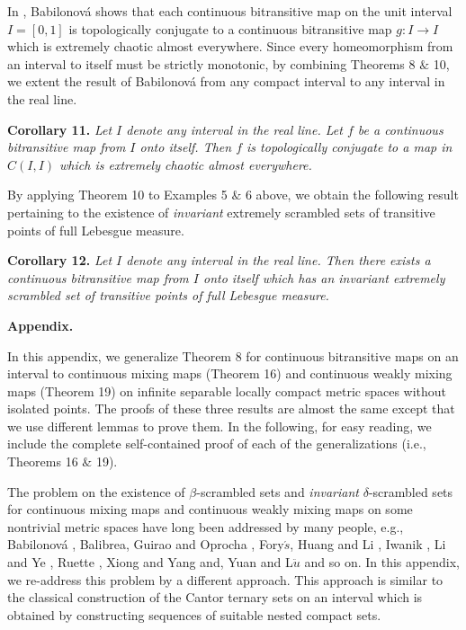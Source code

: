 \documentclass[12pt]{article}
\begin{document}
In {\bf\cite{bab}}, Babilonov\'a shows that each continuous bitransitive map on the unit interval $I = [0, 1]$ is topologically conjugate to a continuous bitransitive map $g: I \longrightarrow I$ which is extremely chaotic almost everywhere.  Since every homeomorphism from an interval to itself must be strictly monotonic, by combining Theorems 8 $\&$ 10, we extent the result of Babilonov\'a from any compact interval to any interval in the real line.

\noindent
{\bf Corollary 11.}
{\it Let $I$ denote any interval in the real line.  Let $f$ be a continuous bitransitive map from $I$ onto itself. Then $f$ is topologically conjugate to a map in $C(I, I)$ which is extremely chaotic almost everywhere.}

By applying Theorem 10 to Examples 5 $\&$ 6 above, we obtain the following result pertaining to the existence of {\it invariant} extremely scrambled sets of transitive points of full Lebesgue measure.

\noindent
{\bf Corollary 12.}
{\it Let $I$ denote any interval in the real line.  Then there exists a continuous bitransitive map from $I$ onto itself which has an invariant extremely scrambled set of transitive points of full Lebesgue measure.} 

\pagebreak

{\bf Appendix.}

In this appendix, we generalize Theorem 8 for continuous bitransitive maps on an interval to continuous mixing maps (Theorem 16) and continuous weakly mixing maps (Theorem 19) on infinite separable locally compact metric spaces without isolated points.  The proofs of these three results are almost the same except that we use different lemmas to prove them.  In the following, for easy reading, we include the complete self-contained proof of each of the generalizations (i.e., Theorems 16 $\&$ 19).  

The problem on the existence of $\beta$-scrambled sets and {\it invariant} $\delta$-scrambled sets for continuous mixing maps and continuous weakly mixing maps on some nontrivial metric spaces have long been addressed by many people, e.g., Babilonov\'a {\bf\cite{bab}}, Balibrea, Guirao and Oprocha {\bf\cite{bal}}, Fory$\acute s$, Huang and Li {\bf\cite{fo}}, Iwanik {\bf\cite{iw}}, Li and Ye {\bf\cite{liye}}, Ruette {\bf\cite{ru}}, Xiong and Yang {\bf\cite{xiong}} and, Yuan and L$\ddot{u}$ {\bf\cite{yuan}} and so on.  In this appendix, we re-address this problem by a different approach.  This approach is similar to the classical construction of the Cantor ternary sets on an interval which is obtained by constructing sequences of suitable nested compact sets.  
\end{document}
